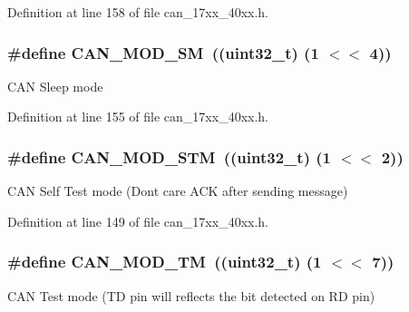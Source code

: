 Definition at line 158 of file can\+\_\+17xx\+\_\+40xx.\+h.

\subsubsection[{\texorpdfstring{C\+A\+N\+\_\+\+M\+O\+D\+\_\+\+SM}{CAN_MOD_SM}}]{\setlength{\rightskip}{0pt plus 5cm}\#define C\+A\+N\+\_\+\+M\+O\+D\+\_\+\+SM~((uint32\+\_\+t) (1 $<$$<$ 4))}\hypertarget{group__CAN__17XX__40XX_gab0cd0939676d3c6ce846e47cc8cc2b15}{}\label{group__CAN__17XX__40XX_gab0cd0939676d3c6ce846e47cc8cc2b15}
C\+AN Sleep mode 

Definition at line 155 of file can\+\_\+17xx\+\_\+40xx.\+h.

\subsubsection[{\texorpdfstring{C\+A\+N\+\_\+\+M\+O\+D\+\_\+\+S\+TM}{CAN_MOD_STM}}]{\setlength{\rightskip}{0pt plus 5cm}\#define C\+A\+N\+\_\+\+M\+O\+D\+\_\+\+S\+TM~((uint32\+\_\+t) (1 $<$$<$ 2))}\hypertarget{group__CAN__17XX__40XX_ga0131118db0e68b5635a10777cbd794e7}{}\label{group__CAN__17XX__40XX_ga0131118db0e68b5635a10777cbd794e7}
C\+AN Self Test mode (Don\textquotesingle{}t care A\+CK after sending message) 

Definition at line 149 of file can\+\_\+17xx\+\_\+40xx.\+h.

\subsubsection[{\texorpdfstring{C\+A\+N\+\_\+\+M\+O\+D\+\_\+\+TM}{CAN_MOD_TM}}]{\setlength{\rightskip}{0pt plus 5cm}\#define C\+A\+N\+\_\+\+M\+O\+D\+\_\+\+TM~((uint32\+\_\+t) (1 $<$$<$ 7))}\hypertarget{group__CAN__17XX__40XX_ga0fc0c3414f4f0e4166e90e271631d89b}{}\label{group__CAN__17XX__40XX_ga0fc0c3414f4f0e4166e90e271631d89b}
C\+AN Test mode (TD pin will reflects the bit detected on RD pin) 


